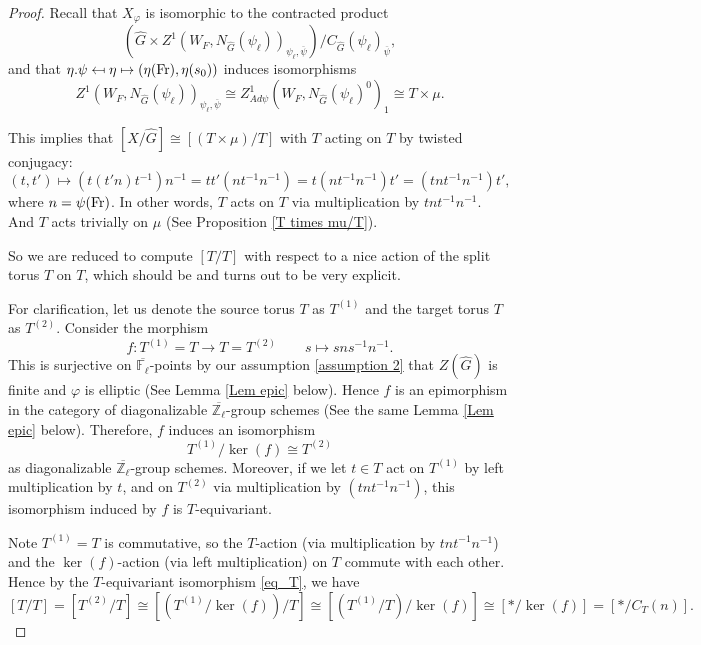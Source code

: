 \begin{proof}
	Recall that $X_{\varphi}$ is isomorphic to the contracted product 
	$$(\hat{G} \times Z^1(W_F, N_{\hat{G}}(\psi_{\ell}))_{\psi_{\ell}, \overline{\psi}})/C_{\hat{G}}(\psi_{\ell})_{\overline{\psi}},$$ 
	and that $\eta.\psi \mapsfrom \eta \mapsto (\eta(\operatorname{Fr}), \eta(s_0))$ induces isomorphisms
	$$Z^1(W_F, N_{\hat{G}}(\psi_{\ell}))_{\psi_{\ell}, \overline{\psi}} \cong Z^1_{Ad\psi}(W_F, N_{\hat{G}}(\psi_{\ell})^0)_1 \cong T \times \mu.$$
	
	This implies that $[X/\hat{G}] \cong [(T \times \mu)/T]$ with $T$ acting on $T$ by twisted conjugacy:
	$$(t, t') \mapsto \left(t(t'n)t^{-1}\right)n^{-1}=tt'(nt^{-1}n^{-1})=t(nt^{-1}n^{-1})t'=(tnt^{-1}n^{-1})t',$$
	where $n=\psi(\operatorname{Fr})$. In other words, $T$ acts on $T$ via multiplication by $tnt^{-1}n^{-1}$. And $T$ acts trivially on $\mu$ (See Proposition \ref{T times mu/T}).
	
	So we are reduced to compute $[T/T]$ with respect to a nice action of the split torus $T$ on $T$, which should be and turns out to be very explicit.
	
	For clarification, let us denote the source torus $T$ as $T^{(1)}$ and the target torus $T$ as $T^{(2)}$. Consider the morphism
	$$f: T^{(1)} = T \longrightarrow T = T^{(2)} \qquad s \longmapsto sns^{-1}n^{-1}.$$
	This is surjective on $\overline{\mathbb{F}_{\ell}}$-points by our assumption \ref{assumption 2} that $Z(\hat{G})$ is finite and $\varphi$ is elliptic (See Lemma \ref{Lem epic} below). Hence $f$ is an epimorphism in the category of diagonalizable $\overline{\mathbb{Z}_{\ell}}$-group schemes (See the same Lemma \ref{Lem epic} below). Therefore, $f$ induces an isomorphism 
	\begin{equation}\label{eq_T}
		T^{(1)}/\ker(f) \cong T^{(2)}
	\end{equation}
	as diagonalizable $\overline{\mathbb{Z}_{\ell}}$-group schemes. Moreover, if we let $t \in T$ act on $T^{(1)}$ by left multiplication by $t$, and on $T^{(2)}$ via multiplication by $(tnt^{-1}n^{-1})$, this isomorphism induced by $f$ is $T$-equivariant.
	
	Note $T^{(1)}=T$ is commutative, so the $T$-action (via multiplication by $tnt^{-1}n^{-1}$) and the $\ker(f)$-action (via left multiplication) on $T$ commute with each other. Hence by the $T$-equivariant isomorphism \eqref{eq_T}, we have
	$$[T/T] = [T^{(2)}/T] \cong \left[\left(T^{(1)}/\ker(f)\right)/T\right] \cong \left[\left(T^{(1)}/T\right)/\ker(f)\right] \cong [*/\ker(f)] = [*/C_T(n)].$$ 
	

\end{proof}
